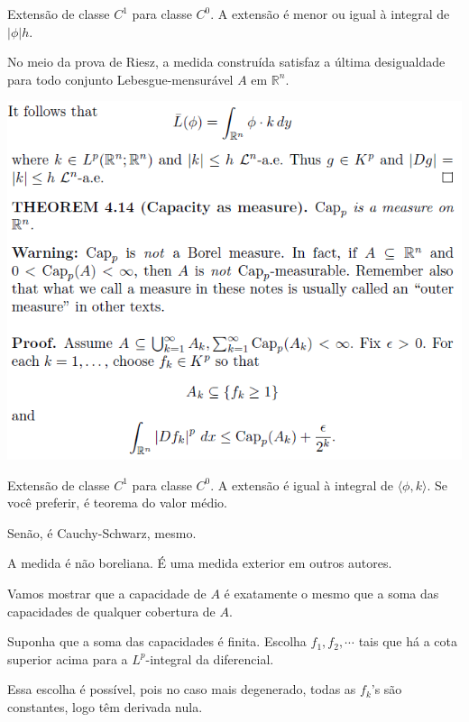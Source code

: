 \documentclass[12pt]{article}
\begin{document}
Extens\~ao de classe $C^1$ para classe $C^0$. A extens\~ao \'e menor ou igual \`a integral de $\vert \phi\vert h$.

No meio da prova de Riesz, a medida constru\'ida satisfaz a \'ultima desigualdade para todo conjunto Lebesgue-mensur\'avel $A$ em $\mathbb{R}^n$.

\vspace{300mm}

		\begin{center}
		\includegraphics{8}
		\end{center}

Extens\~ao de classe $C^1$ para classe $C^0$. A extens\~ao \'e igual \`a integral de $\langle \phi, k \rangle$. Se voc\^e preferir, \'e teorema do valor m\'edio.

Sen\~ao, \'e Cauchy-Schwarz, mesmo.

\vspace{3mm}

A medida \'e n\~ao boreliana. \'E uma medida exterior em outros autores.

\vspace{3mm}

Vamos mostrar que a capacidade de $A$ \'e exatamente o mesmo que a soma das capacidades de qualquer cobertura de $A$.

Suponha que a soma das capacidades \'e finita. Escolha $f_1, f_2, \cdots$ tais que h\'a a cota superior acima para a $L^p$-integral da diferencial.

Essa escolha \'e poss\'ivel, pois no caso mais degenerado, todas as $f_k$'s s\~ao constantes, logo t\^em derivada nula.
\end{document}
